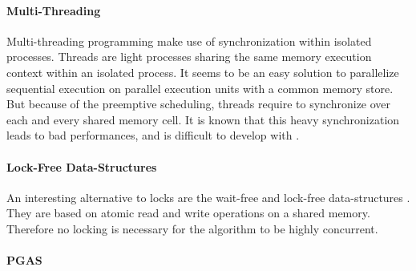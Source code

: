 
\paragraph{Multi-Threading}

Multi-threading programming make use of synchronization within isolated processes.
Threads are light processes sharing the same memory execution context within an isolated process.
It seems to be an easy solution to parallelize sequential execution on parallel execution units with a common memory store.
But because of the preemptive scheduling, threads require to synchronize over each and every shared memory cell.
It is known that this heavy synchronization leads to bad performances, and is difficult to develop with \cite{Adya2002}.

\paragraph{Lock-Free Data-Structures}

An interesting alternative to locks are the wait-free and lock-free data-structures \cite{Lamport1977,Herlihy1988,Herlihy1990,Herlihy1991,Anderson1990}.
They are based on atomic read and write operations on a shared memory.
Therefore no locking is necessary for the algorithm to be highly concurrent.




\paragraph{PGAS}

